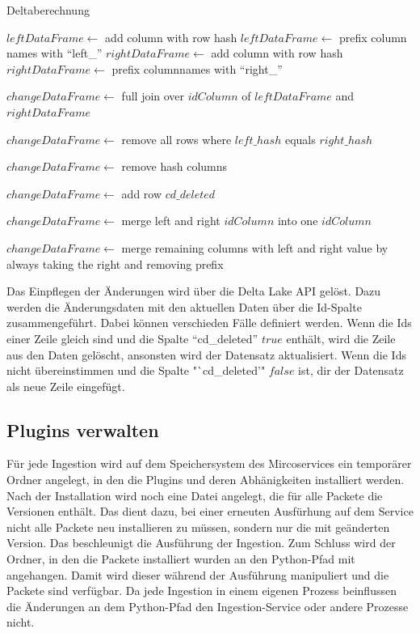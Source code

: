 \begin{algorithm}
    \caption{Deltaberechnung}
    \label{algo:delta-calc}
    $leftDataFrame \gets$ add column with row hash \;
    $leftDataFrame \gets$ prefix column names with "`left\_"' \;
    $rightDataFrame \gets$ add column with row hash \;
    $rightDataFrame \gets$ prefix columnnames with "`right\_"' \;

    $changeDataFrame \gets$ full join over $idColumn$ of $leftDataFrame$ and $rightDataFrame$ \;

    $changeDataFrame \gets$ remove all rows where $left\_hash$ equals $right\_hash$ \;

    $changeDataFrame \gets$ remove hash columns

    $changeDataFrame \gets$ add row $cd\_deleted$ \;

    $changeDataFrame \gets$ merge left and right $idColumn$ into one $idColumn$

    $changeDataFrame \gets$ merge remaining columns with left and right value by always taking the right and removing prefix

\end{algorithm}

Das Einpflegen der Änderungen wird über die Delta Lake API gelöst.
Dazu werden die Änderungsdaten mit den aktuellen Daten über die Id-Spalte zusammengeführt.
Dabei können verschieden Fälle definiert werden.
Wenn die Ids einer Zeile gleich sind und die Spalte "`cd\_deleted"' $true$ enthält, wird die Zeile aus den Daten gelöscht, ansonsten wird der Datensatz aktualisiert.
Wenn die Ids nicht übereinstimmen und die Spalte "`cd\_deleted'" $false$ ist, dir der Datensatz als neue Zeile eingefügt.

\subsection{Plugins verwalten}
Für jede Ingestion wird auf dem Speichersystem des Mircoservices ein temporärer Ordner angelegt, in den die Plugins und deren Abhänigkeiten installiert werden.
Nach der Installation wird noch eine Datei angelegt, die für alle Packete die Versionen enthält.
Das dient dazu, bei einer erneuten Ausfürhung auf dem Service nicht alle Packete neu installieren zu müssen, sondern nur die mit geänderten Version.
Das beschleunigt die Ausführung der Ingestion.
Zum Schluss wird der Ordner, in den die Packete installiert wurden an den Python-Pfad mit angehangen.
Damit wird dieser während der Ausführung manipuliert und die Packete sind verfügbar.
Da jede Ingestion in einem eigenen Prozess beinflussen die Änderungen an dem Python-Pfad den Ingestion-Service oder andere Prozesse nicht.

